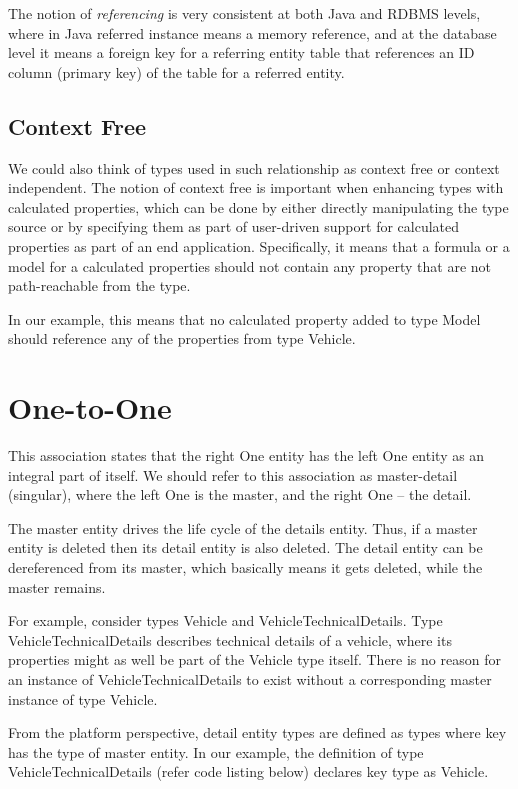   The notion of \emph{referencing} is very consistent at both Java and RDBMS levels, where in Java referred instance means a memory reference, and at the database level it means a foreign key for a referring entity table that references an ID column (primary key) of the table for a referred entity.

  \subsection{Context Free}

  We could also think of types used in such relationship as context free or context independent. The notion of context free is important when enhancing types with calculated properties, which can be done by either directly manipulating the type source or by specifying them as part of user-driven support for calculated properties as part of an end application. Specifically, it means that a formula or a model for a calculated properties should not contain any property that are not path-reachable from the type.

  In our example, this means that no calculated property added to type Model should reference any of the properties from type Vehicle.

\section{One-to-One}

  This association states that the right One entity has the left One entity as an integral part of itself. We should refer to this association as master-detail (singular), where the left One is the master, and the right One -- the detail.

  The master entity drives the life cycle of the details entity. Thus, if a master entity is deleted then its detail entity is also deleted. The detail entity can be dereferenced from its master, which basically means it gets deleted, while the master remains.

  For example, consider types Vehicle and VehicleTechnicalDetails. Type VehicleTechnicalDetails describes technical details of a vehicle, where its properties might as well be part of the Vehicle type itself. There is no reason for an instance of VehicleTechnicalDetails to exist without a corresponding master instance of type Vehicle.

  From the platform perspective, detail entity types are defined as types where key has the type of master entity. In our example, the definition of type VehicleTechnicalDetails (refer code listing below) declares key type as Vehicle.

